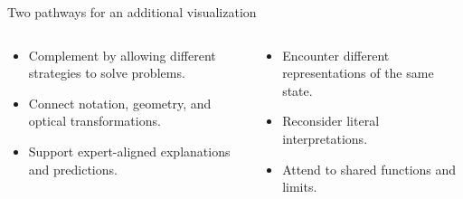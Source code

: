 \begin{frame}{Two pathways for an additional visualization}
\begin{columns}[T,onlytextwidth]
\begin{mynote}
\begin{itemize}
\item Complement by allowing different strategies to solve problems.
\item Connect notation, geometry, and optical transformations.
\item Support expert-aligned explanations and predictions.
\end{itemize}
\end{mynote}
\begin{mynote}
\begin{itemize}
\item Encounter different representations of the same state.
\item Reconsider literal interpretations.
\item Attend to shared functions and limits.
\end{itemize}
\end{mynote}
\end{columns}
\end{frame}
